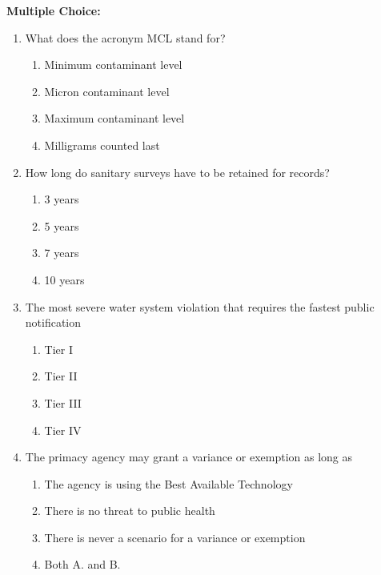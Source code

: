 \documentclass[10pt]{article}
\begin{document}
\newpage
\textbf{Multiple Choice:}\\
\begin{enumerate}
\item  What does the acronym MCL stand for?\\
\begin{enumerate}
\item Minimum contaminant level\\
\item Micron contaminant level\\
\item Maximum contaminant level\\
\item Milligrams counted last
\end{enumerate}

\item  How long do sanitary surveys have to be retained for records?\\
\begin{enumerate}
\item 3 years\\
\item 5 years\\
\item 7 years\\
\item 10 years
\end{enumerate}

\item The most severe water system violation that requires the fastest public notification\\
\begin{enumerate}
\item Tier I\\
\item Tier II\\
\item Tier III\\
\item Tier IV
\end{enumerate}

\item  The primacy agency may grant a variance or exemption as long as\\
\begin{enumerate}
\item The agency is using the Best Available Technology\\
\item There is no threat to public health\\
\item There is never a scenario for a variance or exemption\\
\item Both A. and B.
\end{enumerate}


\end{enumerate}
\end{document}
